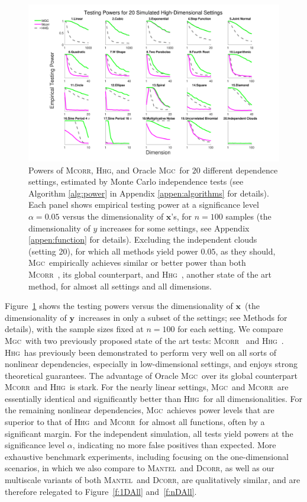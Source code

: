 \documentclass[11pt]{article}
\providecommand{\sct}[1]{{\normalfont\textsc{#1}}}
\providecommand{\mb}[1]{\boldsymbol{#1}}
\newcommand{\Mgc}{\sct{Mgc}}
\newcommand{\Hhg}{\sct{Hhg}}
\newcommand{\Dcorr}{\sct{Dcorr}}
\newcommand{\Mcorr}{\sct{Mcorr}}
\newcommand{\Mantel}{\sct{Mantel}}
\newcommand{\mbx}{\ensuremath{\mb{x}}}
\newcommand{\mby}{\ensuremath{\mb{y}}}
\begin{document}
\begin{figure}[htbp]
\includegraphics[width=1.0\textwidth]{Figures/FigHDPower}
\caption{Powers of \Mcorr, \Hhg, and Oracle \Mgc~for $20$ different dependence settings, estimated by Monte Carlo independence tests (see Algorithm \ref{alg:power} in Appendix \ref{appen:algorithms} for details).  
Each panel shows empirical testing power at a significance level $\alpha=0.05$
versus the dimensionality of $\mb{x}$'s, for $n=100$ samples (the dimensionality of $y$ increases for some settings, see Appendix \ref{appen:function} for details). 
Excluding the independent clouds (setting 20), for which all methods yield power $0.05$, as they should, \Mgc~empirically achieves similar or better power than both \Mcorr~\cite{SzekelyRizzo2013a}, its global counterpart, and \Hhg~\cite{HellerGorfine2013}, another state of the art method, for almost all settings and all dimensions. 
}
\label{f:nD}
\end{figure}

Figure~\ref{f:nD} shows the testing powers versus the dimensionality of \mbx~(the dimensionality of \mby~increases in only a subset of the settings; see Methods for details), with the sample sizes fixed at $n=100$ for each setting.  We compare   \Mgc~with two previously proposed state of the art tests: \Mcorr~\cite{SzekelyRizzo2013a} and \Hhg~\cite{HellerGorfine2013}.  \Hhg~has previously been demonstrated to perform very well on all sorts of nonlinear dependencies, especially in low-dimensional settings, and enjoys strong theoretical guarantees. 
%
The advantage of Oracle \Mgc~over its global counterpart \Mcorr~and \Hhg~is  stark. For the nearly linear settings, \Mgc~and \Mcorr~are essentially identical and significantly better than \Hhg~for all dimensionalities.  For the remaining nonlinear dependencies, \Mgc~achieves power levels that are superior to that of \Hhg~and \Mcorr~for almost all functions, often by a significant margin.  For the independent simulation, all tests yield powers at the significance level $\alpha$,  indicating no more false positives than expected.
More exhaustive benchmark experiments, including focusing on the one-dimensional scenarios,
in which we also compare to \Mantel~and \Dcorr, 
as well as our  multiscale variants of both \Mantel~and \Dcorr, 
 are qualitatively similar, and are therefore relegated to Figure~\ref{f:1DAll} and~\ref{f:nDAll}.
\end{document}
